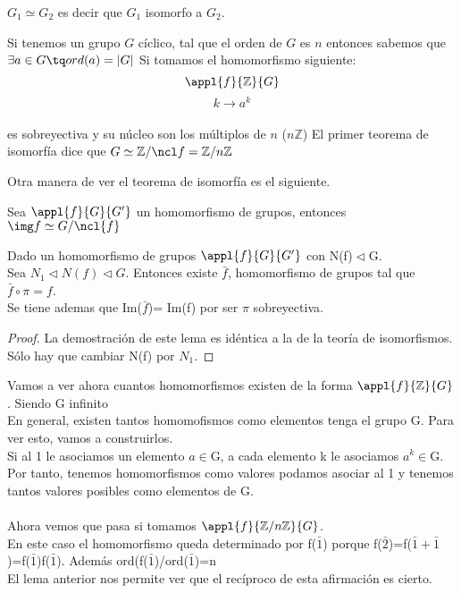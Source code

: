 \documentclass[nochap]{apuntes}
\begin{document}
\begin{notacion}
$G_1 \simeq G_2$ es decir que $G_1$ isomorfo a $G_2$.
\end{notacion}

\begin{example}
Si tenemos un grupo $G$ cíclico, tal que el orden de $G$ es $n$ entonces sabemos que
$\exists a \in G \tq ord(a) = |G|$
Si tomamos el homomorfismo siguiente:\\
$$\appl{f}{\mathbb{Z}}{G}$$
$$k \longrightarrow a^k$$\\
es sobreyectiva y su núcleo son los múltiplos de $n$ ($n\mathbb{Z}$)
El primer teorema de isomorfía dice que $G \simeq \mathbb{Z}/\ncl f  = \mathbb{Z}/n\mathbb{Z}$
\end{example}

Otra manera de ver el teorema de isomorfía es el siguiente.
\begin{theorem}
Sea $\appl{f}{G}{G'}$ un homomorfismo de grupos, entonces $\img f \simeq G/\ncl{f}$
\end{theorem}

\begin{lemma}
 Dado un homomorfismo de grupos $\appl{f}{G}{G'}$  con N(f)$\vartriangleleft$G.\\
 Sea $N_1 \vartriangleleft N(f) \vartriangleleft G$. Entonces existe $\bar{f}$, homomorfismo de grupos tal que $\bar{f}\circ\pi=f$.\\
 Se tiene ademas que Im($\bar{f}$)= Im(f) por ser $\pi$  sobreyectiva.
\end{lemma}
\begin{proof}
 La demostración de este lema es idéntica a la de la teoría de isomorfismos. Sólo hay que cambiar N(f) por $N_1$.
\end{proof}

Vamos a ver ahora cuantos homomorfismos existen de la forma $\appl{f}{\mathbb{Z}}{G}$. Siendo G infinito\\
En general, existen tantos homomofismos como elementos tenga el grupo G. Para ver esto, vamos a construirlos.\\
Si al 1 le asociamos un elemento $a \in$G, a cada elemento k le asociamos $a^{k}\in$G. Por tanto, tenemos homomorfismos como valores
podamos asociar al 1 y tenemos tantos valores posibles como elementos de G.\\
\\
Ahora vemos que pasa si tomamos $\appl{f}{\mathbb{Z}/n\mathbb{Z}}{G}$. \\
En este caso el homomorfismo queda determinado por f($\bar{1}$) porque
f($\bar{2}$)=f($\bar{1}+\bar{1}$)=f($\bar{1}$)f($\bar{1}$). Además ord(f($\bar{1}$)/ord($\bar{1}$)=n\\
El lema anterior nos permite ver que el recíproco de esta afirmación es cierto.\\
\end{document}
